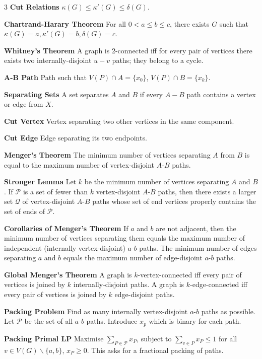 \documentclass[10pt, landscape]{article}
\begin{document}
\begin{multicols*}{3}
\textbf{Cut Relations} $\kappa(G) \leq \kappa'(G) \leq \delta(G)$.

\textbf{Chartrand-Harary Theorem} For all $0 < a \leq b \leq c$, there exists $G$ such that $\kappa(G)=a, \kappa'(G)=b, \delta(G)=c$.

\textbf{Whitney's Theorem} A graph is 2-connected iff for every pair of vertices there exists two internally-disjoint $u-v$ paths; they belong to a cycle.

\textbf{A-B Path} Path such that $V(P) \cap A = \{ x_0 \}$, $V(P) \cap B = \{x_k\}$.

\textbf{Separating Sets} A set separates $A$ and $B$ if every $A-B$ path contains a vertex or edge from $X$.

\textbf{Cut Vertex} Vertex separating two other vertices in the same component.

\textbf{Cut Edge} Edge separating its two endpoints.

\textbf{Menger's Theorem} The minimum number of vertices separating $A$ from $B$ is equal to the maximum number of vertex-disjoint $A$-$B$ paths.

\textbf{Stronger Lemma} Let $k$ be the minimum number of vertices separating $A$ and $B$. If $\mathcal{P}$ is a set of fewer than $k$ vertex-disjoint $A$-$B$ paths, then there exists a larger set $\mathcal{Q}$ of vertex-disjoint $A$-$B$ paths whose set of end vertices properly contains the set of ends of $\mathcal{P}$.

\textbf{Corollaries of Menger's Theorem} If $a$ and $b$ are not adjacent, then the minimum number of vertices separating them equals the maximum number of independent (internally vertex-disjoint) $a$-$b$ paths. The minimum number of edges separating $a$ and $b$ equals the maximum number of edge-disjoint $a$-$b$ paths.

\textbf{Global Menger's Theorem} A graph is $k$-vertex-connected iff every pair of vertices is joined by $k$ internally-disjoint paths. A graph is $k$-edge-connected iff every pair of vertices is joined by $k$ edge-disjoint paths.

\textbf{Packing Problem} Find as many internally vertex-disjoint $a$-$b$ paths as possible. Let $\mathcal{P}$ be the set of all $a$-$b$ paths. Introduce $x_p$ which is binary for each path.

\textbf{Packing Primal LP} Maximise $\sum_{P \in \mathcal{P}}x_P$, subject to $\sum_{v \in P}x_P \leq 1$ for all $v \in V(G) \backslash\{a,b\}$, $x_P \geq 0$. This asks for a fractional packing of paths.


\end{multicols*}
\end{document}
